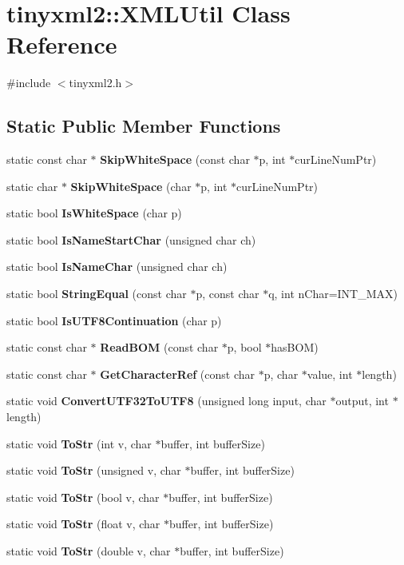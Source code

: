 \section{tinyxml2\+:\+:X\+M\+L\+Util Class Reference}
\label{classtinyxml2_1_1_x_m_l_util}


{\ttfamily \#include $<$tinyxml2.\+h$>$}

\subsection*{Static Public Member Functions}
\begin{DoxyCompactItemize}
\item 
static const char $\ast$ \textbf{ Skip\+White\+Space} (const char $\ast$p, int $\ast$cur\+Line\+Num\+Ptr)
\item 
static char $\ast$ \textbf{ Skip\+White\+Space} (char $\ast$p, int $\ast$cur\+Line\+Num\+Ptr)
\item 
static bool \textbf{ Is\+White\+Space} (char p)
\item 
static bool \textbf{ Is\+Name\+Start\+Char} (unsigned char ch)
\item 
static bool \textbf{ Is\+Name\+Char} (unsigned char ch)
\item 
static bool \textbf{ String\+Equal} (const char $\ast$p, const char $\ast$q, int n\+Char=I\+N\+T\+\_\+\+M\+AX)
\item 
static bool \textbf{ Is\+U\+T\+F8\+Continuation} (char p)
\item 
static const char $\ast$ \textbf{ Read\+B\+OM} (const char $\ast$p, bool $\ast$has\+B\+OM)
\item 
static const char $\ast$ \textbf{ Get\+Character\+Ref} (const char $\ast$p, char $\ast$value, int $\ast$length)
\item 
static void \textbf{ Convert\+U\+T\+F32\+To\+U\+T\+F8} (unsigned long input, char $\ast$output, int $\ast$length)
\item 
static void \textbf{ To\+Str} (int v, char $\ast$buffer, int buffer\+Size)
\item 
static void \textbf{ To\+Str} (unsigned v, char $\ast$buffer, int buffer\+Size)
\item 
static void \textbf{ To\+Str} (bool v, char $\ast$buffer, int buffer\+Size)
\item 
static void \textbf{ To\+Str} (float v, char $\ast$buffer, int buffer\+Size)
\item 
static void \textbf{ To\+Str} (double v, char $\ast$buffer, int buffer\+Size)

\end{DoxyCompactItemize}
